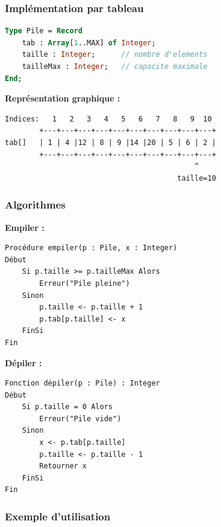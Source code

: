 \documentclass[12pt,a4paper]{article}
\begin{document}
\subsubsection{Implémentation par tableau}

\begin{lstlisting}[language=Pascal]
Type Pile = Record
    tab : Array[1..MAX] of Integer;
    taille : Integer;      // nombre d'elements
    tailleMax : Integer;   // capacite maximale
End;
\end{lstlisting}

\begin{exemple}
\textbf{Représentation graphique :}
\begin{verbatim}
Indices:   1   2   3   4   5   6   7   8   9  10
        +---+---+---+---+---+---+---+---+---+---+
tab[]   | 1 | 4 |12 | 8 | 9 |14 |20 | 5 | 6 | 2 |
        +---+---+---+---+---+---+---+---+---+---+
                                            ^
                                        taille=10
\end{verbatim}
\end{exemple}

\subsubsection{Algorithmes}

\begin{algorithme}
\textbf{Empiler :}
\begin{verbatim}
Procédure empiler(p : Pile, x : Integer)
Début
    Si p.taille >= p.tailleMax Alors
        Erreur("Pile pleine")
    Sinon
        p.taille <- p.taille + 1
        p.tab[p.taille] <- x
    FinSi
Fin
\end{verbatim}
\end{algorithme}

\begin{algorithme}
\textbf{Dépiler :}
\begin{verbatim}
Fonction dépiler(p : Pile) : Integer
Début
    Si p.taille = 0 Alors
        Erreur("Pile vide")
    Sinon
        x <- p.tab[p.taille]
        p.taille <- p.taille - 1
        Retourner x
    FinSi
Fin
\end{verbatim}
\end{algorithme}

\subsubsection{Exemple d'utilisation}
\end{document}
